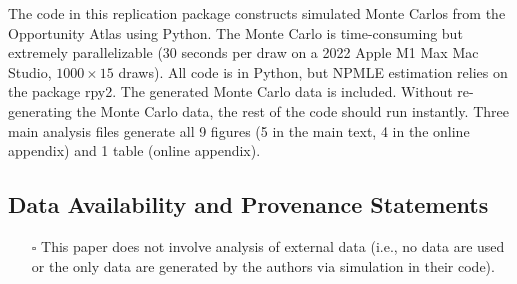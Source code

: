 \documentclass[10pt]{article}
\providecommand{\tightlist}{%
  \setlength{\itemsep}{0pt}\setlength{\parskip}{0pt}}
\begin{document}

The code in this replication package constructs simulated Monte Carlos from the
Opportunity Atlas \citep{DVN/NKCQM1_2022} using Python. The Monte Carlo is
time-consuming but extremely parallelizable (30 seconds per draw on a 2022 Apple M1 Max
Mac Studio, $1000 \times 15$ draws). All code is in Python, but NPMLE estimation relies on
the package rpy2. The generated Monte Carlo data is included. Without re-generating the
Monte Carlo data, the rest of the code should run instantly. Three main analysis files
generate all 9 figures (5 in the main text, 4 in the online appendix) and 1 table (online
appendix).

\hypertarget{data-availability-and-provenance-statements}{%
\subsection{Data Availability and Provenance
Statements}\label{data-availability-and-provenance-statements}}


\begin{itemize}
\tightlist
\item[$\square$]
  This paper does not involve analysis of external data (i.e., no data
  are used or the only data are generated by the authors via simulation
  in their code).
\end{itemize}

\end{document}
